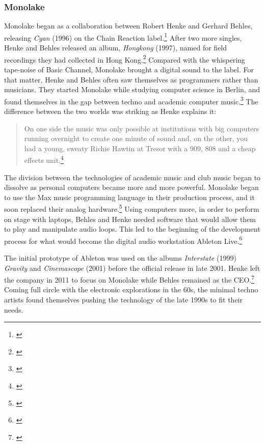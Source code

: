 \documentclass[12pt,twoside]{reedthesis}
\begin{document}
\subsubsection{Monolake}

Monolake began as a collaboration between Robert Henke and Gerhard Behles, releasing \emph{Cyan} (1996) on the Chain Reaction label.\footnote{\cite{monolakeCyan1996}} After two more singles, Henke and Behles released an album, \emph{Hongkong} (1997), named for field recordings they had collected in Hong Kong.\footnote{\cite{monolakeHongkong1997}} Compared with the whispering tape-noise of Basic Channel, Monolake brought a digital sound to the label. For that matter, Henke and Behles often saw themselves as programmers rather than musicians. They started Monolake while studying computer science in Berlin, and found themselves in the gap between techno and academic computer music.\footnote{\cite{maya-roisinslaterGerhardBehlesRobert2016}} The difference between the two worlds was striking as Henke explains it:

\begin{quote}
	On one side the music was only possible at institutions with big computers running overnight to create one minute of sound and, on the other, you had a young, sweaty Richie Hawtin at Tresor with a 909, 808 and a cheap effects unit.\footnote{\cite{burnsMonolakeSoundScientist2012}}
\end{quote}

The division between the technologies of academic music and club music began to dissolve as personal computers became more and more powerful. Monolake began to use the Max music programming language in their production process, and it soon replaced their analog hardware.\footnote{\cite{maya-roisinslaterGerhardBehlesRobert2016}} Using computers more, in order to perform on stage with laptops, Behles and Henke needed software that would allow them to play and manipulate audio loops. This led to the beginning of the development process for what would become the digital audio workstation Ableton Live.\footnote{\cite{maya-roisinslaterGerhardBehlesRobert2016}}

The initial prototype of Ableton was used on the albums \emph{Interstate} (1999) \emph{Gravity} and \emph{Cinemascope} (2001) before the official release in late 2001. Henke left the company in 2011 to focus on Monolake while Behles remained as the CEO.\footnote{\cite{maya-roisinslaterGerhardBehlesRobert2016}} Coming full circle with the electronic explorations in the 60s, the minimal techno artists found themselves pushing the technology of the late 1990s to fit their needs.
\end{document}
